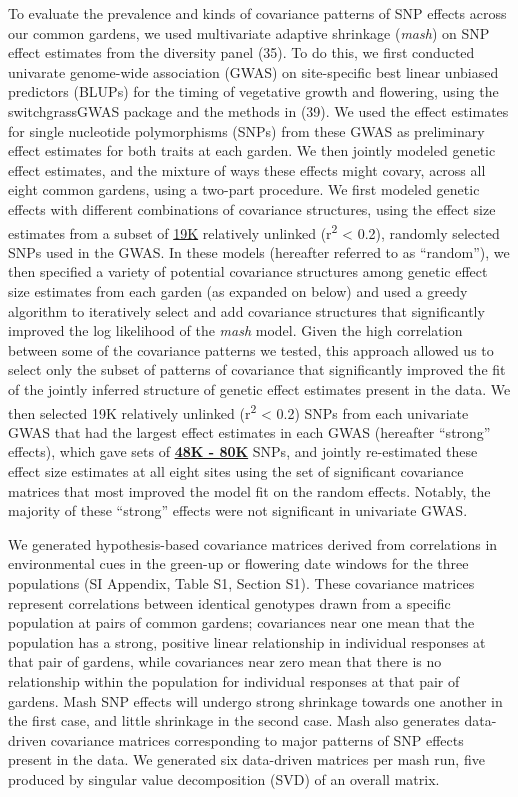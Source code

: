 \documentclass[
  9pt,
  twocolumn,
  twoside]{pnas-new}
\begin{document}
To evaluate the prevalence and kinds of covariance patterns of SNP
effects across our common gardens, we used multivariate adaptive
shrinkage (\emph{mash}) on SNP effect estimates from the diversity panel
(35). To do this, we first conducted univarate genome-wide association
(GWAS) on site-specific best linear unbiased predictors (BLUPs) for the
timing of vegetative growth and flowering, using the switchgrassGWAS
package and the methods in (39). We used the effect estimates for single
nucleotide polymorphisms (SNPs) from these GWAS as preliminary effect
estimates for both traits at each garden. We then jointly modeled
genetic effect estimates, and the mixture of ways these effects might
covary, across all eight common gardens, using a two-part procedure. We
first modeled genetic effects with different combinations of covariance
structures, using the effect size estimates from a subset of \ul{19K}
relatively unlinked (r\textsuperscript{2} \textless{} 0.2), randomly
selected SNPs used in the GWAS. In these models (hereafter referred to
as ``random''), we then specified a variety of potential covariance
structures among genetic effect size estimates from each garden (as
expanded on below) and used a greedy algorithm to iteratively select and
add covariance structures that significantly improved the log likelihood
of the \emph{mash} model. Given the high correlation between some of the
covariance patterns we tested, this approach allowed us to select only
the subset of patterns of covariance that significantly improved the fit
of the jointly inferred structure of genetic effect estimates present in
the data. We then selected 19K relatively unlinked (r\textsuperscript{2}
\textless{} 0.2) SNPs from each univariate GWAS that had the largest
effect estimates in each GWAS (hereafter ``strong'' effects), which gave
sets of \ul{\textbf{48K - 80K}} SNPs, and jointly re-estimated these
effect size estimates at all eight sites using the set of significant
covariance matrices that most improved the model fit on the random
effects. Notably, the majority of these ``strong'' effects were not
significant in univariate GWAS.

We generated hypothesis-based covariance matrices derived from
correlations in environmental cues in the green-up or flowering date
windows for the three populations (SI Appendix, Table S1, Section S1).
These covariance matrices represent correlations between identical
genotypes drawn from a specific population at pairs of common gardens;
covariances near one mean that the population has a strong, positive
linear relationship in individual responses at that pair of gardens,
while covariances near zero mean that there is no relationship within
the population for individual responses at that pair of gardens. Mash
SNP effects will undergo strong shrinkage towards one another in the
first case, and little shrinkage in the second case. Mash also generates
data-driven covariance matrices corresponding to major patterns of SNP
effects present in the data. We generated six data-driven matrices per
mash run, five produced by singular value decomposition (SVD) of an
overall matrix.
\end{document}
